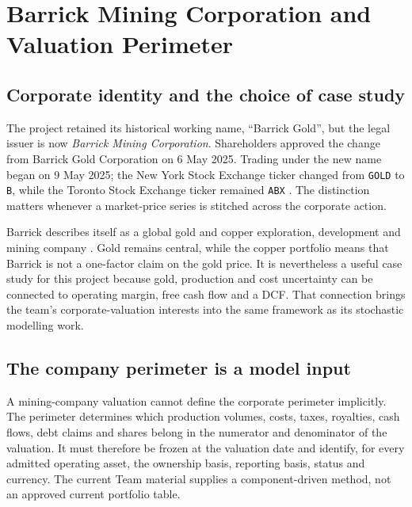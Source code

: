 \chapter{Barrick Mining Corporation and Valuation Perimeter}

\section{Corporate identity and the choice of case study}

The project retained its historical working name, ``Barrick Gold'', but the
legal issuer is now \emph{Barrick Mining Corporation}. Shareholders approved
the change from Barrick Gold Corporation on 6 May 2025. Trading under the new
name began on 9 May 2025; the New York Stock Exchange ticker changed from
\texttt{GOLD} to \texttt{B}, while the Toronto Stock Exchange ticker remained
\texttt{ABX} \cite{barrick-name-2025}. The distinction matters whenever a
market-price series is stitched across the corporate action.

Barrick describes itself as a global gold and copper exploration, development
and mining company \cite{barrick-about-2026}. Gold remains central, while the
copper portfolio means that Barrick is not a one-factor claim on the gold
price. It is nevertheless a useful case study for this project because gold,
production and cost uncertainty can be connected to operating margin, free
cash flow and a DCF. That connection brings the team's corporate-valuation
interests into the same framework as its stochastic modelling work.

\section{The company perimeter is a model input}

A mining-company valuation cannot define the corporate perimeter implicitly.
The perimeter determines which production volumes, costs, taxes, royalties,
cash flows, debt claims and shares belong in the numerator and denominator of
the valuation. It must therefore be frozen at the valuation date and identify,
for every admitted operating asset, the ownership basis, reporting basis,
status and currency. The current Team material supplies a component-driven
method, not an approved current portfolio table.

